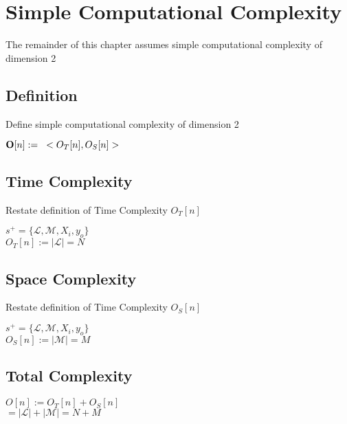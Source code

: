 \documentclass[11pt]{article}
\begin{document}
\newpage
\section{Simple Computational Complexity}
The remainder of this chapter assumes simple computational complexity of dimension 2

\subsection{Definition}
Define simple computational complexity of dimension 2
\begin{center}
$
\bold{O}[n] := \hspace{3mm} < O_T [n], O_S [n] >
$
\end{center}





\subsection{Time Complexity}
Restate definition of Time Complexity $O_T[n]$
\begin{center}
$
s^+ = \{ \mathcal{L},\mathcal{M},X_i,y_o\}
$
\\ \vspace{3mm}
$
O_T[n] := |\mathcal{L}| = N
$
\end{center}



\subsection{Space Complexity}
Restate definition of Time Complexity $O_S[n]$
\begin{center}
$
s^+ = \{ \mathcal{L},\mathcal{M},X_i,y_o\}
$
\\ \vspace{2mm}
$
O_S[n] := |\mathcal{M}| = M
$
\end{center}





\subsection{Total Complexity}
\begin{center}
$O[n] := O_T[n] + O_S[n]$
\\ \vspace{2mm}
$= |\mathcal{L}| + |\mathcal{M}| = N + M$
\end{center}
\end{document}
